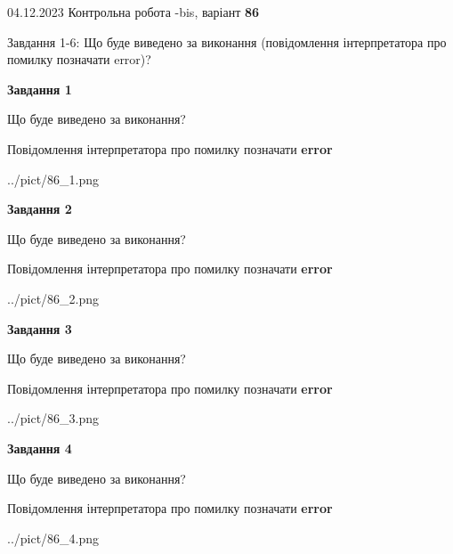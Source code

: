 \documentclass[12pt, ukrainian]{article}
\begin{document}
{{04.12.2023 Контрольна робота -bis, варіант  \No \textbf { 86 }\par}}
{

Завдання 1-6: Що буде виведено за виконання (повідомлення інтерпретатора про помилку позначати error)?


{\begin {center}\textbf{Завдання 1}\end {center}}\par
Що буде виведено за виконання? \par
Повідомлення інтерпретатора про помилку позначати \textbf{error}

\begin{center}
	{../pict/86_1.png}
\end{center}
\newpage

{\begin {center}\textbf{Завдання 2}\end {center}}\par
Що буде виведено за виконання? \par
Повідомлення інтерпретатора про помилку позначати \textbf{error}

\begin{center}
	{../pict/86_2.png}
\end{center}
\newpage

{\begin {center}\textbf{Завдання 3}\end {center}}\par
Що буде виведено за виконання? \par
Повідомлення інтерпретатора про помилку позначати \textbf{error}

\begin{center}
	{../pict/86_3.png}
\end{center}
\newpage

{\begin {center}\textbf{Завдання 4}\end {center}}\par
Що буде виведено за виконання? \par
Повідомлення інтерпретатора про помилку позначати \textbf{error}

\begin{center}
	{../pict/86_4.png}
\end{center}
\newpage

}
\end{document}
